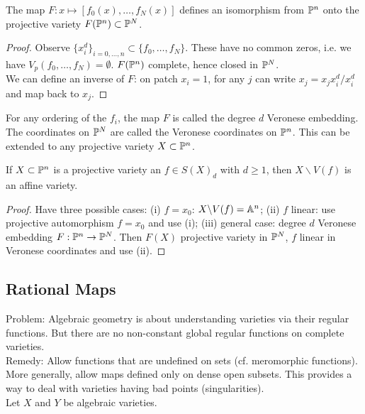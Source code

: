 \documentclass[a4paper,11pt]{article}
\begin{document}
			\begin{prop}
				The map $F:x\mapsto[f_0(x),\dots,f_N(x)]$ defines an isomorphism from $\P^n$ onto the projective variety $F(\P^n)\subset\P^N$.
			\end{prop}
			\begin{proof}
				Observe $\{x_i^d\}_{i=0,\dots,n}\subset\{f_0,\dots,f_N\}$. These have no common zeros, i.e. we have $V_p(f_0,\dots,f_N)=\emptyset$. $F(\P^n)$ complete, hence closed in $\P^N$.\\ We can define an inverse of $F$: on patch $x_i=1$, for any $j$ can write $x_j=x_jx_i^d/x_i^d$ and map back to $x_j$. 
			\end{proof}

			For any ordering of the $f_i$, the map $F$ is called the degree $d$ Veronese embedding. The coordinates on $\P^N$ are called the Veronese coordinates on $\P^n$. This can be extended to any projective variety $X\subset\P^n$.

			\begin{prop}
				If $X\subset\P^n$ is a projective variety an $f\in S(X)_d$ with $d\ge1$, then $X\backslash V(f)$ is an affine variety.
 			\end{prop}
			\begin{proof}
				Have three possible cases: (i) $f=x_0$: $X\backslash V(f)=\AA^n$; (ii) $f$ linear: use projective automorphism $f=x_0$ and use (i); (iii) general case: degree $d$ Veronese embedding $F:\P^n\rightarrow\P^N$. Then $F(X)$ projective variety in $\P^N$, $f$ linear in Veronese coordinates and use (ii).
			\end{proof}


		\subsection{Rational Maps}

			Problem: Algebraic geometry is about understanding varieties via their regular functions. But there are no non-constant global regular functions on complete varieties.
			\\

			\noindent Remedy: Allow functions that are undefined on  sets (cf. meromorphic functions). More generally, allow maps defined only on dense open subsets. This provides a way to deal with varieties having bad points (singularities).
			\\

			\noindent Let $X$ and $Y$ be algebraic varieties.
			\\
\end{document}
